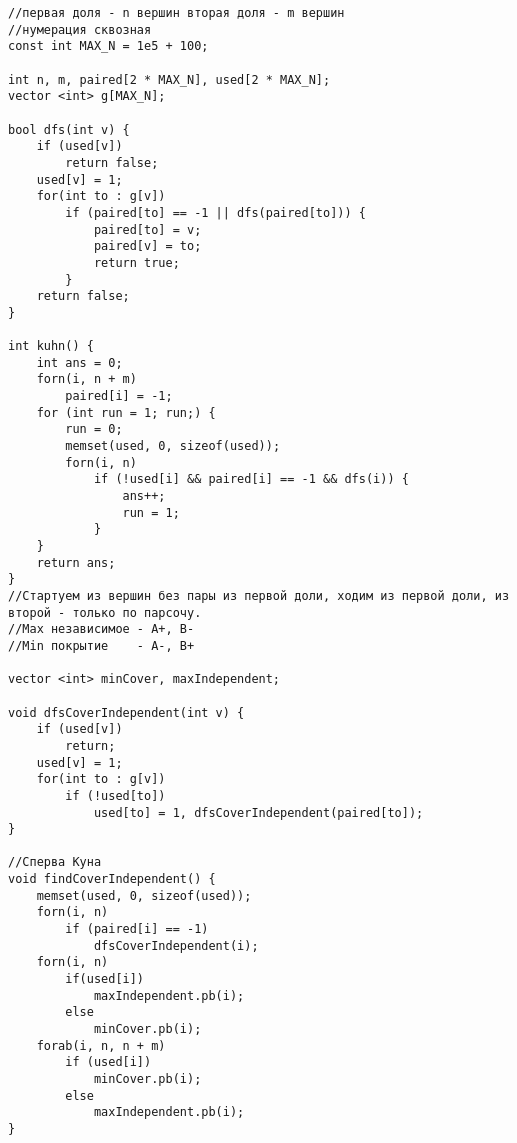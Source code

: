 \begin{verbatim}
//первая доля - n вершин вторая доля - m вершин
//нумерация сквозная
const int MAX_N = 1e5 + 100;

int n, m, paired[2 * MAX_N], used[2 * MAX_N];
vector <int> g[MAX_N];

bool dfs(int v) {
	if (used[v])
		return false;
	used[v] = 1;
	for(int to : g[v]) 
		if (paired[to] == -1 || dfs(paired[to])) {
			paired[to] = v;
			paired[v] = to;
			return true;
		}
	return false;
}

int kuhn() {
	int ans = 0;
	forn(i, n + m)
		paired[i] = -1;
	for (int run = 1; run;) { 
		run = 0;
		memset(used, 0, sizeof(used));
		forn(i, n) 
			if (!used[i] && paired[i] == -1 && dfs(i)) {
				ans++;
				run = 1;
			}
	}
	return ans;
}
//Стартуем из вершин без пары из первой доли, ходим из первой доли, из второй - только по парсочу.
//Max независимое - A+, B-
//Min покрытие    - A-, B+ 

vector <int> minCover, maxIndependent;

void dfsCoverIndependent(int v) {
	if (used[v])
		return;
	used[v] = 1;
	for(int to : g[v]) 
		if (!used[to])
			used[to] = 1, dfsCoverIndependent(paired[to]);
}

//Сперва Куна
void findCoverIndependent() {
	memset(used, 0, sizeof(used));
	forn(i, n)
		if (paired[i] == -1)
			dfsCoverIndependent(i);
	forn(i, n)
		if(used[i])
			maxIndependent.pb(i);
		else
			minCover.pb(i);
	forab(i, n, n + m)
		if (used[i])
			minCover.pb(i);
		else 
			maxIndependent.pb(i);
}
\end{verbatim}
